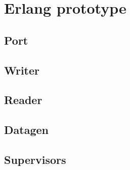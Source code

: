 \chapter{Erlang prototype}\label{appendix:erlang_prototype}

\section{Port}\label{secB:port}

\section{Writer}

\section{Reader}

\section{Datagen}

\section{Supervisors}\label{secB:supervisor}